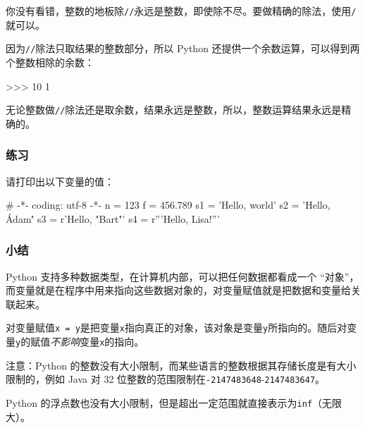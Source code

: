 你没有看错，整数的地板除\texttt{//}永远是整数，即使除不尽。要做精确的除法，使用\texttt{/}就可以。

因为\texttt{//}除法只取结果的整数部分，所以 Python
还提供一个余数运算，可以得到两个整数相除的余数：

\begin{pythoncode}
>>> 10 %
1
\end{pythoncode}

无论整数做\texttt{//}除法还是取余数，结果永远是整数，所以，整数运算结果永远是精确的。

\hypertarget{ux7ec3ux4e60}{%
\subsubsection{练习}\label{ux7ec3ux4e60}}

请打印出以下变量的值：

\begin{pythoncode}
# -*- coding: utf-8 -*-
n = 123
f = 456.789
s1 = 'Hello, world'
s2 = 'Hello, \'Adam\''
s3 = r'Hello, "Bart"'
s4 = r'''Hello,
Lisa!'''
\end{pythoncode}

\hypertarget{ux5c0fux7ed3}{%
\subsubsection{小结}\label{ux5c0fux7ed3}}

Python 支持多种数据类型，在计算机内部，可以把任何数据都看成一个
``对象''，而变量就是在程序中用来指向这些数据对象的，对变量赋值就是把数据和变量给关联起来。

对变量赋值\texttt{x\ =\ y}是把变量\texttt{x}指向真正的对象，该对象是变量\texttt{y}所指向的。随后对变量\texttt{y}的赋值\emph{不影响}变量\texttt{x}的指向。

注意：Python
的整数没有大小限制，而某些语言的整数根据其存储长度是有大小限制的，例如
Java 对 32 位整数的范围限制在\texttt{-2147483648}-\texttt{2147483647}。

Python
的浮点数也没有大小限制，但是超出一定范围就直接表示为\texttt{inf}（无限大）。

